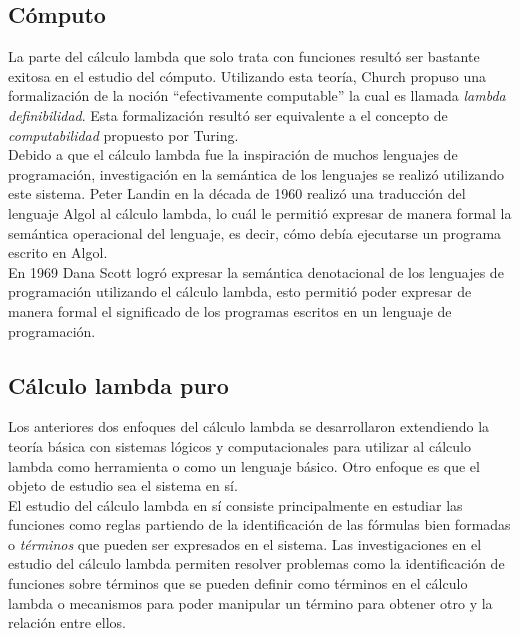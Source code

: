 \subsection{Cómputo}

La parte del cálculo lambda que solo trata con funciones resultó ser bastante
exitosa en el estudio del cómputo. Utilizando esta teoría, Church propuso una
formalización de la noción ``efectivamente computable'' la cual es llamada
\emph{lambda definibilidad}. Esta formalización resultó ser equivalente a el
concepto de \emph{computabilidad} propuesto por Turing.\\

Debido a que el cálculo lambda fue la inspiración de muchos lenguajes de
programación, investigación en la semántica de los lenguajes se realizó
utilizando este sistema. Peter Landin en la década de 1960 realizó una
traducción del lenguaje Algol al cálculo lambda, lo cuál le permitió expresar de
manera formal la semántica operacional del lenguaje, es decir, cómo debía
ejecutarse un programa escrito en Algol.\\

En 1969 Dana Scott logró expresar la semántica denotacional de los lenguajes de
programación utilizando el cálculo lambda, esto permitió poder expresar de
manera formal el significado de los programas escritos en un lenguaje de
programación.\\

\subsection{Cálculo lambda puro}

Los anteriores dos enfoques del cálculo lambda se desarrollaron extendiendo la
teoría básica con sistemas lógicos y computacionales para utilizar al cálculo
lambda como herramienta o como un lenguaje básico. Otro enfoque es que el objeto
de estudio sea el sistema en sí.\\

El estudio del cálculo lambda en sí consiste principalmente en estudiar las
funciones como reglas partiendo de la identificación de las fórmulas bien
formadas o \emph{términos} que pueden ser expresados en el sistema. Las
investigaciones en el estudio del cálculo lambda permiten resolver problemas
como la identificación de funciones sobre términos que se pueden definir como
términos en el cálculo lambda o mecanismos para poder manipular un término para
obtener otro y la relación entre ellos.\\


